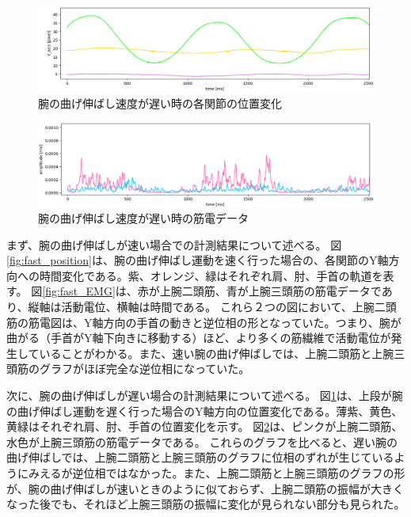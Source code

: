 \documentclass{jsarticle}
\begin{document}
\begin{figure}[!h]
	\begin{center}
		\includegraphics[width=17cm]{graph_image/slow_position.png}
		\caption{腕の曲げ伸ばし速度が遅い時の各関節の位置変化}
		\label{fig:slow_position}
	\end{center}
\end{figure}

\begin{figure}[!h]
	\begin{center}
		\includegraphics[width=17cm]{graph_image/slow_EMG.png}
		\caption{腕の曲げ伸ばし速度が遅い時の筋電データ}
		\label{fig:slow_EMG}
	\end{center}
\end{figure}


まず、腕の曲げ伸ばしが速い場合での計測結果について述べる。
図\ref{fig:fast_position}は、腕の曲げ伸ばし運動を速く行った場合の、各関節のY軸方向への時間変化である。紫、オレンジ、緑はそれぞれ肩、肘、手首の軌道を表す。
図\ref{fig:fast_EMG}は、赤が上腕二頭筋、青が上腕三頭筋の筋電データであり、縦軸は活動電位、横軸は時間である。
これら２つの図において、上腕二頭筋の筋電図は、Y軸方向の手首の動きと逆位相の形となっていた。つまり、腕が曲がる（手首がY軸下向きに移動する）ほど、より多くの筋繊維で活動電位が発生していることがわかる。また、速い腕の曲げ伸ばしでは、上腕二頭筋と上腕三頭筋のグラフがほぼ完全な逆位相になっていた。

次に、腕の曲げ伸ばしが遅い場合の計測結果について述べる。
図\ref{fig:slow_position}は、上段が腕の曲げ伸ばし運動を遅く行った場合のY軸方向の位置変化である。薄紫、黄色、黄緑はそれぞれ肩、肘、手首の位置変化を示す。
図\ref{fig:slow_EMG}は、ピンクが上腕二頭筋、水色が上腕三頭筋の筋電データである。
これらのグラフを比べると、遅い腕の曲げ伸ばしでは、上腕二頭筋と上腕三頭筋のグラフに位相のずれが生じているようにみえるが逆位相ではなかった。また、上腕二頭筋と上腕三頭筋のグラフの形が、腕の曲げ伸ばしが速いときのように似ておらず、上腕二頭筋の振幅が大きくなった後でも、それほど上腕三頭筋の振幅に変化が見られない部分も見られた。
\end{document}

